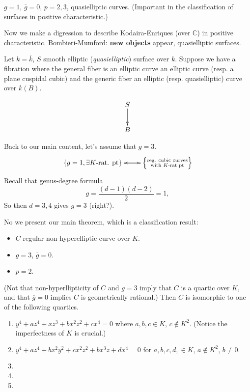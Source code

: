 \begin{example}
\label{example-quasielliptic}
$g=1$, $\overline{g}=0$, $p=2,3$,
quasielliptic curves. (Important in the
classification of surfaces
in positive characteristic.)
\end{example}

\medskip\noindent
Now we make a digression to describe
Kodaira-Enriques (over $\mathbb{C}$)
in positive characteristic. Bombieri-Mumford:
{\bf new objects} appear,
quasielliptic surfaces.

Let $k=\overline{k}$, $S$ smooth elliptic
({\it quasielliptic}) surface over $k$.
Suppose we have a fibration
where the general fiber is an elliptic curve
an elliptic curve (resp. a plane
cuspidal cubic) and the generic fiber an
elliptic (resp. quasielliptic)
curve over $k(B)$.

$$
\xymatrix{
S\ar[d]\\
B
}
$$

\medskip\noindent
Back to our main content, let's assume that
$g=3$.
$$
\xymatrix{
\{g=1,\exists K\text{-rat. pt}\}\ar[r]&\ar[l]
\left\{\substack{\text{reg. cubic curves} \\
\text{with $K$-rat pt}}\right\}
}
$$
Recall that genus-degree formula
$$
g=\frac{(d-1)(d-2)}{2}=1,
$$
So then $d=3,4$ gives  $g=3$ (right?).

No we present our main theorem, which is a
classification result:

\begin{theorem}
\label{theorem-classification-quartics}
\begin{itemize}
\item $C$ regular non-hyperelliptic curve
over $K$.
\item  $g=3$, $\overline{g}=0$.
\item $p=2$.
\end{itemize}
(Not that non-hyperllipticity of $C$ and
$g=3$ imply that $C$ is a quartic
over $K$, and that  $\overline{g}=0$ implies
$C$ is geometrically rational.)
Then $C$ is isomorphic to one of the
following quartics.

\begin{enumerate}
\item $y^4+az^4+xz^3+bx^2z^2+cx^4=0$ where
$a,b,c \in K$, $c \not \in K^2$.
(Notice the imperfectness of $K$ is crucial.)

\item $y^4+az^4+bx^2y^2+cx^2z^2+bx^3z+dx^4=0$
for $a,b,c,d, \in K$,
$a \not \in K^2$, $b\not =0$.

\item
\item
\item
\end{enumerate}
\end{theorem}

